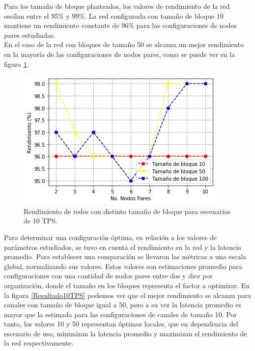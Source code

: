 Para los tama\~no de bloque planteados, los valores de rendimiento de la red oscilan entre el 95$\%$ y 99$\%$. La red configurada con tama\~no de bloque 10 mantiene un rendimiento constante de 96$\%$ para las configuraciones de nodos pares estudiadas.\\

 En el caso de la red con bloques de tama\~no 50 se alcanza un mejor rendimiento en la mayor\'ia de las configuraciones de nodos pares, como se puede ver en la figura \ref{RendimientoPares10TPS}.\\

\begin{figure}[h]
\centering
\includegraphics[scale=0.5]{Graphics/RendimientoPares10TPS.png}
\caption{Rendimiento de redes con distinto tama\~no de bloque para escenarios de 10 TPS.}
\label{RendimientoPares10TPS}
\end{figure}

\newpage

Para determinar una configuraci\'on \'optima, en relaci\'on a los valores de par\'ametros estudiados, se tuvo en cuenta el rendimiento en la red y la latencia promedio. Para establecer una comparaci\'on se llevaron las m\'etricas a una escala global, normalizando sus valores. Estos valores son estimaciones promedio para configuraciones con una cantidad de nodos pares entre dos y diez por organizaci\'on, donde el tama\~no en los bloques representa el factor a optimizar. En la figura \ref{Resultado10TPS} podemos ver que el mejor rendimiento se alcanza para canales con tama\~no de bloque igual a 50, pero a su vez la latencia promedio es mayor que la estimada para las configuraciones de canales de tama\~no 10. Por tanto, los valores 10 y 50 representan \'optimos locales, que en dependencia del escenario de uso, minimizan la latencia promedio y maximizan el rendimiento de la red respectivamente.\\

